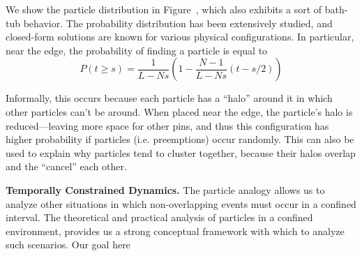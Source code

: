 We show the particle distribution in Figure~\cite{fig:particle-sim}, which also exhibits a sort of bath-tub behavior. 
The probability distribution has been extensively studied, and closed-form solutions are known for various physical configurations.
In particular, near the edge, the probability of finding a particle is equal to
\begin{equation}
  \label{eq:balls-krauth}
  P(t\geq s) = \dfrac{1}{L-Ns}\left(1-\dfrac{N-1}{L-Ns}(t-s/2)\right)
\end{equation}


Informally, this occurs because each particle has a ``halo'' around it in which other particles can't be around. 
When placed near the edge, the particle's halo is reduced---leaving more space for other pins, and thus this configuration has higher probability if particles (i.e. preemptions) occur randomly.
This can also be used to explain why particles tend to cluster together, because their halos overlap and the ``cancel'' each other.


\noindent \textbf{Temporally Constrained Dynamics.}
The particle analogy allows us to analyze other situations in which non-overlapping events must occur in a confined interval.
The theoretical and practical analysis of particles in a confined environment, provides us a strong conceptual framework with which to analyze such scenarios.
Our goal here 



